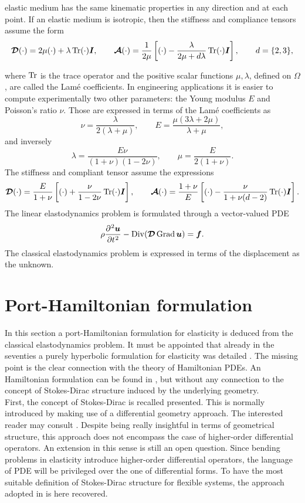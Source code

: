 elastic medium has the same kinematic properties in any direction and at each point. If an elastic medium is isotropic, then the stiffness and compliance tensors assume the form
\[
\bm{\mathcal{D}}(\cdot) = 2\mu (\cdot) + \lambda \operatorname{Tr}(\cdot)\bm{I}, \qquad \bm{\mathcal{A}}(\cdot) = \frac{1}{2\mu}\left[(\cdot) - \frac{\lambda}{2\mu + d\lambda}\operatorname{Tr}(\cdot)\bm{I}\right], \qquad d= \{2,3\},
\]

where  $\operatorname{Tr}$ is the trace operator and the positive scalar functions $\mu, \lambda$, defined on $\Omega$, are called the Lam\'e coefficients. In engineering applications it is easier to compute experimentally two other parameters: the Young modulus $E$ and  Poisson's ratio $\nu$. Those are expressed in terms of the Lam\'e  coefficients as 
\[
\nu =\frac{\lambda}{2(\lambda +\mu)}, \qquad 
E=\frac{\mu (3\lambda +2\mu)}{\lambda +\mu},
\]
and inversely
\[
\lambda =\frac {E\nu }{(1+\nu )(1-2\nu )}, \qquad
\mu = \frac{E}{2(1+\nu)}.
\]
The stiffness and compliant tensor assume the expressions
\[
\bm{\mathcal{D}}(\cdot) = \frac{E}{1+\nu} \left[(\cdot) + \frac{\nu}{1-2\nu}\operatorname{Tr}(\cdot)\bm{I}\right], \qquad \bm{\mathcal{A}}(\cdot) = \frac{1+\nu}{E}\left[(\cdot) - \frac{\nu}{1+\nu(d-2)}\operatorname{Tr}(\cdot)\bm{I}\right].
\]
The linear elastodynamics problem is formulated through a vector-valued PDE
\begin{equation}\label{eq:lin_elastodyn}
\rho \diffp[2]{\bm{u}}{t} - \Div(\bm{\mathcal{D}} \Grad \bm{u}) = \bm{f}.
\end{equation}  
The classical elastodynamics problem is expressed in terms of the displacement as the unknown. 

\section{Port-Hamiltonian formulation}

In this section a port-Hamiltonian formulation for elasticity is deduced from the classical elastodynamics problem. It must be appointed that already in the seventies a purely hyperbolic formulation for elasticity was detailed \cite{hughes1978classical}. The missing point is the clear connection with the theory of Hamiltonian PDEs. An Hamiltonian formulation can be found in \cite{grinfield2015}, but without any connection to the concept of Stokes-Dirac structure induced by the underlying geometry. \\

First, the concept of Stokes-Dirac is recalled presented. This is normally introduced by making use of a differential geometry approach. The interested reader may consult \cite[Chapter 2]{kotyczka2019numerical}. Despite being really insightful in terms of geometrical structure, this approach does not encompass the case of higher-order differential operators. An extension in this sense is still an open question. Since bending problems in elasticity introduce higher-order differential operators, the language of PDE will be privileged over the one of differential forms. To have the most suitable definition of Stokes-Dirac structure for flexible systems, the approach adopted in \cite{macchelli2005modelling} is here recovered.\\

